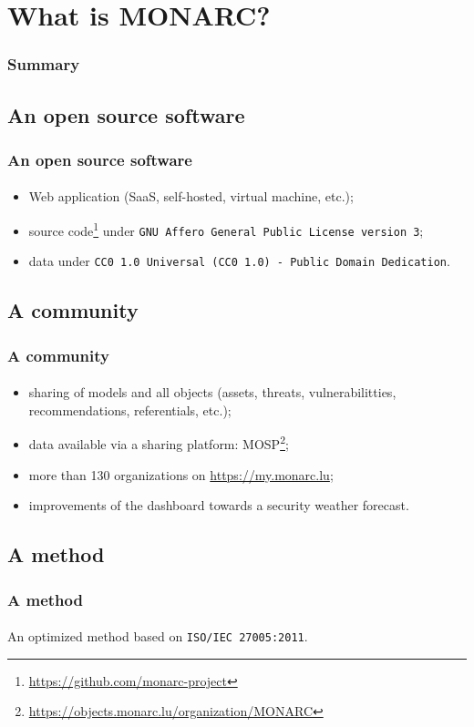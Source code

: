 %
%
\section{What is MONARC?}
\begin{frame}
    \frametitle{Summary}
\end{frame}
\subsection{An open source software}
\begin{frame}
\frametitle{An open source software}
\framesubtitle{}
    \begin{itemize}
        \item Web application (SaaS, self-hosted, virtual machine, etc.);
        \item source code\footnote{\url{https://github.com/monarc-project}} under \texttt{GNU Affero General Public License version 3};
        \item data under \texttt{CC0 1.0 Universal (CC0 1.0) - Public Domain Dedication}.
    \end{itemize}
\end{frame}

\subsection{A community}
\begin{frame}
\frametitle{A community}
\framesubtitle{}
    \begin{itemize}
        \item sharing of models and all objects (assets, threats, vulnerabilitties, recommendations, referentials, etc.);
        \item data available via a sharing platform: MOSP\footnote{\url{https://objects.monarc.lu/organization/MONARC}};
        \item more than 130 organizations on \url{https://my.monarc.lu};
        \item improvements of the dashboard towards a security weather forecast.
    \end{itemize}
\end{frame}

\subsection{A method}
\begin{frame}
\frametitle{A method}
\framesubtitle{}
    An optimized method based on \texttt{ISO/IEC 27005:2011}.
\end{frame}
